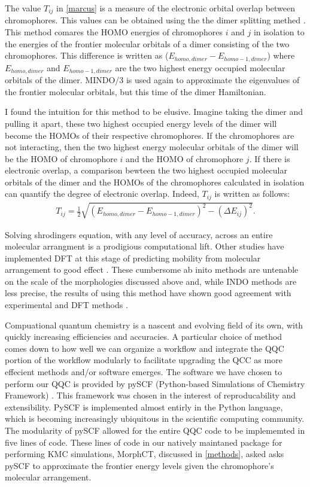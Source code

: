 The value $T_{ij}$ in \autoref{marcus} is a measure of the electronic orbital overlap between chromophores.
This values can be obtained using the
the dimer splitting methed \cite{Huang2005b}. This method comares the HOMO energies of chromophores $i$ and
$j$ in isolation to the energies of the frontier molecular orbitals of a dimer
consisting of the two chromophores. 
This difference is written as ($E_{homo,dimer} - E_{homo-1,dimer}$) where $E_{homo,dimer}$ 
and $E_{homo-1,dimer}$ are the two highest energy occupied molecular orbitals of the dimer. MINDO/3 is used
again to approximate the eigenvalues of the frontier molecular orbitals, but this time of the dimer
Hamiltonian. 

I found the intuition for this method to be elusive.
Imagine taking the dimer and pulling it apart, these two highest occupied energy levels of the dimer will become the HOMOs of their respective chromophores. 
If the chromophores are not interacting, 
then the two highest energy molecular orbitals of the dimer will be the HOMO of chromophore $i$ and the 
HOMO of chromophore $j$. If there is electronic overlap, a comparison bewteen the two highest occupied
molecular orbitals of the dimer and the HOMOs of the chromophores calculated in isolation can quantify the degree of
electronic overlap. Indeed, $T_{ij}$ is written as follows:
\begin{align}
    T_{ij} = \frac{1}{2}\sqrt{ (E_{homo,dimer} - E_{homo-1,dimer})^{2} - (\Delta E_{ij})^{2} }.
\end{align}
 

Solving shrodingers equation, with any level of accuracy,
across an entire molecular arrangment is a prodigious computational lift.
Other studies have implemented DFT at this stage of predicting
mobility from molecular arrangement to good effect \cite{Deng2004}. These cumbersome ab inito methods are
untenable on the scale of the morphologies discussed above and, while INDO methods are less precise, the results
of using this method have shown good agreement with experimental and DFT methods \cite{Bredas2002}. 

Compuational quantum chemistry is a nascent and evolving field of its
own, with quickly increasing efficiencies and accuracies.
A particular 
choice of method comes down to how well we can organize a workflow and integrate the QQC portion of the
workflow modularly to facilitate upgrading the QCC as more effecient methods and/or software emerges.
The software we have chosen to perform our QQC is
provided by pySCF (Python-based Simulations of Chemistry Framework) \cite{Sun2018a}. This framework
was chosen in the interest of reproducability and extensibility.
PySCF is implemented almost entirly in the Python 
language, which is becoming increasingly ubiquitous in the scientific computing community. The modularity of
pySCF allowed for the entire QQC code to be implememted in five lines of code. These lines of code in 
our natively maintaned package
for performing KMC simulations, MorphCT, discussed in
\autoref{methods}, asked asks pySCF to approximate the frontier
energy levels given the chromophore's molecular arrangement.  

